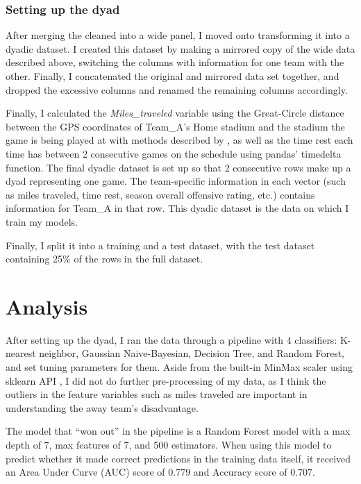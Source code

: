 \documentclass[12pt, letterpaper, twoside]{article}
\begin{document}
\subsubsection{Setting up the dyad}

After merging the cleaned into a wide panel, I moved onto transforming it into a dyadic dataset. I created this dataset by making a mirrored copy of the wide data described above, switching the columns with information for one team with the other. Finally, I concatenated the original and mirrored data set together, and dropped the excessive columns and renamed the remaining columns accordingly. 

Finally, I calculated the \textit{Miles\_traveled} variable using the Great-Circle distance between the GPS coordinates of Team\_A's Home stadium and the stadium the game is being played at with methods described by \cite{distance}, as well as the time rest each time has between 2 consecutive games on the schedule using pandas' timedelta function. The final dyadic dataset is set up so that 2 consecutive rows make up a dyad representing one game. The team-specific information in each vector (such as miles traveled, time rest, season overall offensive rating, etc.) contains information for Team\_A in that row. This dyadic dataset is the data on which I train my models.

Finally, I split it into a training and a test dataset, with the test dataset containing 25\% of the rows in the full dataset.


\section{Analysis}

After setting up the dyad, I ran the data through a pipeline with 4 classifiers: K-nearest neighbor, Gaussian Naive-Bayesian, Decision Tree, and Random Forest, and set tuning parameters for them. Aside from the built-in MinMax scaler using sklearn API \citep{sklearn_api}, I did not do further pre-processing of my data, as I think the outliers in the feature variables such as miles traveled are important in understanding the away team's disadvantage. 

The model that ``won out'' in the pipeline is a Random Forest model with a max depth of 7, max features of 7, and 500 estimators. When using this model to predict whether it made correct predictions in the training data itself, it received an Area Under Curve (AUC) score of 0.779 and Accuracy score of 0.707. 
\end{document}
